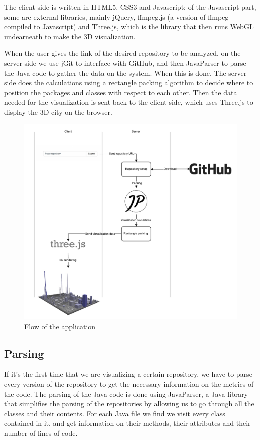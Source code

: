 \documentclass[]{usiinfbachelorproject}
\begin{document}
The client side is written in HTML5, CSS3 and Javascript; of the Javascript part, some are external libraries, mainly jQuery, ffmpeg.js (a version of ffmpeg compiled to Javascript) and Three.js, which is the library that then runs WebGL undearneath to make the 3D visualization.

When the user gives the link of the desired repository to be analyzed, on the server side we use jGit to interface with GitHub, and then JavaParser to parse the Java code to gather the data on the system. When this is done, The server side does the calculations using a rectangle packing algorithm to decide where to position the packages and classes with respect to each other. Then the data needed for the visualization is sent back to the client side, which uses Three.js to display the 3D city on the browser.

\begin{figure} [H]
\centering
\includegraphics[width=1\textwidth]{pictures/flow.pdf}
\caption{Flow of the application}
\label{fig:flow}
\end{figure}

\subsection{Parsing} \label{Parsing}
If it's the first time that we are visualizing a certain repository, we have to parse every version of the repository to get the necessary information on the metrics of the code.
The parsing of the Java code is done using JavaParser, a Java library that simplifies the parsing of the repositories by allowing us to go through all the classes and their contents.
For each Java file we find we visit every class contained in it, and get information on their methods, their attributes and their number of lines of code.
\end{document}

